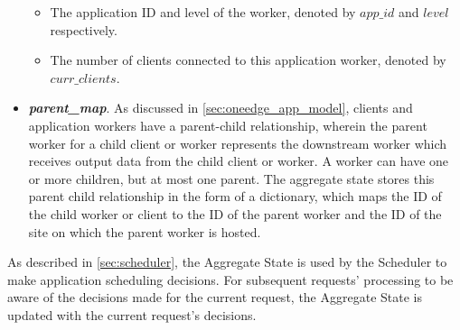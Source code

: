 \begin{itemize}
\begin{itemize}
\item The application ID and level of the worker, denoted by $app\_id$ and $level$ respectively.
\item The number of clients connected to this application worker, denoted by $curr\_clients$.
\end{itemize}
\item \textit{\textbf{parent\_map}}. As discussed in \cref{sec:oneedge_app_model}, clients and application workers have a parent-child relationship, wherein the parent worker for a child client or worker represents the downstream worker which receives output data from the child client or worker. A worker can have one or more children, but at most one parent. The aggregate state stores this parent child relationship in the form of a dictionary, which maps the ID of the child worker or client to the ID of the parent worker and the ID of the site on which the parent worker is hosted.
\end{itemize}
As described in \cref{sec:scheduler}, the Aggregate State is used by the Scheduler to make application scheduling decisions. For subsequent requests' processing to be aware of the decisions made for the current request, the Aggregate State is updated with the current request's decisions. 

